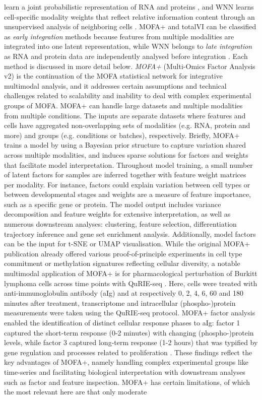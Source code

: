 \documentclass[times, twoside, watermark]{zHenriquesLab-StyleBioRxiv}
\begin{document}
learn a joint probabilistic representation of RNA and proteins \cite{Gayoso2021}, and WNN learns cell-specific modality weights that reflect relative information content through an unsupervised analysis of neighboring cells \cite{Hao2021}. MOFA+ and totalVI can be classified as \textit{early integration} methods because features from multiple modalities are integrated into one latent representation, while WNN belongs to \textit{late integration} as RNA and protein data are independently analysed before integration \cite{Adossa2021}. Each method is discussed in more detail below. \newline \textit{MOFA+} (Multi-Omics Factor Analysis v2) \cite{Argelaguet2020} is the continuation of the MOFA statistical network \cite{Argelaguet2018} for integrative multimodal analysis, and it addresses certain assumptions and technical challenges related to scalability and inability to deal with complex experimental groups of MOFA. MOFA+ can handle large datasets and multiple modalities from multiple conditions. The inputs are separate datasets where features and cells have aggregated non-overlapping sets of modalities (e.g. RNA, protein and more) and groups (e.g. conditions or batches), respectively. Briefly, MOFA+ trains a model by using a Bayesian prior structure to capture variation shared across multiple modalities, and induces sparse solutions for factors and weights that facilitate model interpretation. Throughout model training, a small number of latent factors for samples are inferred together with feature weight matrices per modality. For instance, factors could explain variation between cell types or between developmental stages and weights are a measure of feature importance, such as a specific gene or protein. The model output includes variance decomposition and feature weights for extensive interpretation, as well as numerous downstream analyses: clustering, feature selection, differentiation trajectory inference and gene set enrichment analysis. Additionally, model factors can be the input for t-SNE or UMAP visualisation. While the original MOFA+ publication already offered various proof-of-principle experiments in cell type commitment or methylation signatures reflecting cellular diversity, a notable multimodal application of MOFA+ is for pharmacological perturbation of Burkitt lymphoma cells across time points with QuRIE-seq \cite{Rivello2020}. Here, cells were treated with anti-immunoglobulin antibody (aIg) and at respectively 0, 2, 4, 6, 60 and 180 minutes after treatment, transcriptome and intracellular (phospho-)protein measurements were taken using the QuRIE-seq protocol. MOFA+ factor analysis enabled the identification of distinct cellular response phases to aIg: factor 1 captured the short-term response (0-2 minutes) with changing (phospho-)protein levels, while factor 3 captured long-term response (1-2 hours) that was typified by gene regulation and processes related to proliferation \cite{Rivello2020}. These findings reflect the key advantages of MOFA+, namely handling complex experimental groups like time-series and facilitating biological interpretation with downstream analyses such as factor and feature inspection. MOFA+ has certain limitations, of which the most relevant here are that only moderate 
\end{document}
